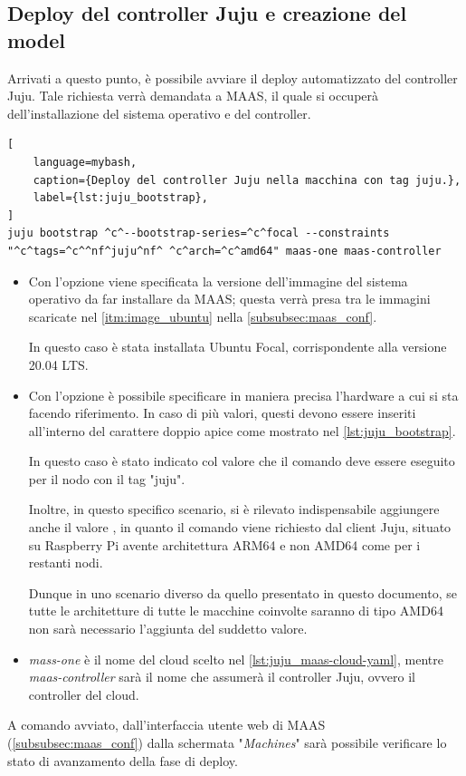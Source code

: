 \subsection{Deploy del controller Juju e creazione del model}\label{sec:juju_model_create}
Arrivati a questo punto, è possibile avviare il deploy automatizzato del controller Juju.
% 
Tale richiesta verrà demandata a MAAS, il quale si occuperà dell'installazione del sistema operativo e del controller.
\begin{lstlisting}[
    language=mybash, 
    caption={Deploy del controller Juju nella macchina con tag juju.}, 
    label={lst:juju_bootstrap},
]
juju bootstrap ^c^--bootstrap-series=^c^focal --constraints "^c^tags=^c^^nf^juju^nf^ ^c^arch=^c^amd64" maas-one maas-controller
\end{lstlisting}
% 
%
\begin{itemize}
    \item Con l'opzione  viene specificata la versione dell'immagine del sistema operativo da far installare da MAAS;
    questa verrà presa tra le immagini scaricate nel \cref{itm:image_ubuntu} nella \cref{subsubsec:maas_conf}.

    In questo caso è stata installata Ubuntu Focal, corrispondente alla versione 20.04 LTS.

    \item Con l'opzione  è possibile specificare in maniera precisa l'hardware a cui si sta facendo riferimento.
    In caso di più valori, questi devono essere inseriti all'interno del carattere doppio apice come mostrato nel \cref{lst:juju_bootstrap}.
    
    In questo caso è stato indicato col valore  che il comando deve essere eseguito per il nodo con il tag "juju".
    
    Inoltre, in questo specifico scenario, si è rilevato indispensabile aggiungere anche il valore , in quanto il comando  viene richiesto dal client Juju, situato su Raspberry Pi avente architettura ARM64 e non AMD64 come per i restanti nodi.

    Dunque in uno scenario diverso da quello presentato in questo documento, se tutte le architetture di tutte le macchine coinvolte saranno di tipo AMD64 non sarà necessario l'aggiunta del suddetto valore.

    \item \emph{mass-one} è il nome del cloud scelto nel \cref{lst:juju_maas-cloud-yaml}, mentre \emph{maas-controller} sarà il nome che assumerà il controller Juju, ovvero il controller del cloud.

\end{itemize}
% 
A comando avviato, dall'interfaccia utente web di MAAS (\cref{subsubsec:maas_conf}) dalla schermata "\emph{Machines}" sarà possibile verificare lo stato di avanzamento della fase di deploy.

